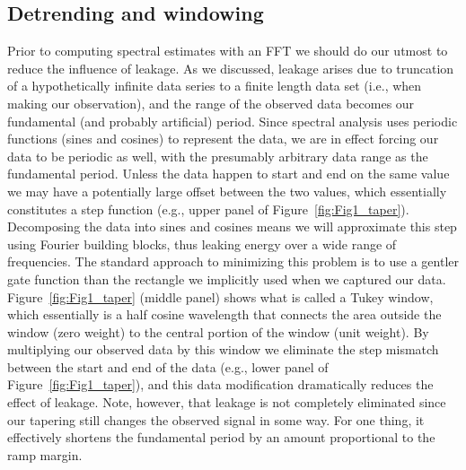 \subsection{Detrending and windowing}

Prior to computing spectral estimates with an FFT we should do our utmost to reduce the influence of leakage.  As we discussed,
leakage arises due to truncation of a hypothetically infinite data series to a finite length data set (i.e., when making our observation), and the range of
the observed data becomes our fundamental (and probably artificial) period.  Since spectral analysis uses
periodic functions (sines and cosines) to represent the data, we are in effect forcing our data to be periodic as well, with the presumably
arbitrary data range as the fundamental period.  Unless the data happen to start and end on the same value we may have a potentially large
offset between the two values, which essentially constitutes a step function (e.g., upper panel of Figure~\ref{fig:Fig1_taper}).  Decomposing the data into sines and cosines
means we will approximate this step using  Fourier building blocks, thus leaking energy over a wide range of frequencies.
The standard approach to minimizing this problem is to use a gentler gate function than the rectangle we implicitly used when we captured our
data.  Figure~\ref{fig:Fig1_taper} (middle panel) shows what is called a Tukey window, which essentially is a half cosine wavelength that
connects the area outside the window (zero weight) to the central portion of the window (unit weight).  By multiplying our
observed data by this window we eliminate the step mismatch between the start and end of the data (e.g., lower panel of Figure~\ref{fig:Fig1_taper}), and this data modification dramatically
reduces the effect of leakage.  Note, however, that leakage is not completely eliminated since our tapering still changes the observed signal
in some way.  For one thing, it effectively shortens the fundamental period by an amount proportional to the ramp margin.

